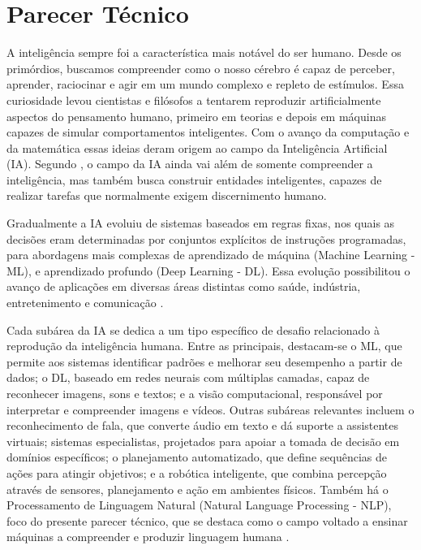 \chapter{Parecer Técnico} \label{cha:parecertecnico}

A inteligência sempre foi a característica mais notável do ser humano. Desde os primórdios, buscamos compreender como o nosso cérebro é capaz de perceber, aprender, raciocinar e agir em um mundo complexo e repleto de estímulos. Essa curiosidade levou cientistas e filósofos a tentarem reproduzir artificialmente aspectos do pensamento humano, primeiro em teorias e depois em máquinas capazes de simular comportamentos inteligentes. Com o avanço da computação e da matemática essas ideias deram origem ao campo da Inteligência Artificial (IA). Segundo \textcite{russell2022}, o campo da IA ainda vai além de somente compreender a inteligência, mas também busca construir entidades inteligentes, capazes de realizar tarefas que normalmente exigem discernimento humano.

Gradualmente a IA evoluiu de sistemas baseados em regras fixas, nos quais as decisões eram determinadas por conjuntos explícitos de instruções programadas, para abordagens mais complexas de aprendizado de máquina (Machine Learning - ML), e aprendizado profundo (Deep Learning - DL). Essa evolução possibilitou o avanço de aplicações em diversas áreas distintas como saúde, indústria, entretenimento e comunicação \cite{nilsson2010quest}.

Cada subárea da IA se dedica a um tipo específico de desafio relacionado à reprodução da inteligência humana. Entre as principais, destacam-se o ML, que permite aos sistemas identificar padrões e melhorar seu desempenho a partir de dados; o DL, baseado em redes neurais com múltiplas camadas, capaz de reconhecer imagens, sons e textos; e a visão computacional, responsável por interpretar e compreender imagens e vídeos.
Outras subáreas relevantes incluem o reconhecimento de fala, que converte áudio em texto e dá suporte a assistentes virtuais; sistemas especialistas, projetados para apoiar a tomada de decisão em domínios específicos; o planejamento automatizado, que define sequências de ações para atingir objetivos; e a robótica inteligente, que combina percepção através de sensores, planejamento e ação em ambientes físicos.
Também há o Processamento de Linguagem Natural (Natural Language Processing - NLP), foco do presente parecer técnico, que se destaca como o campo voltado a ensinar máquinas a compreender e produzir linguagem humana \cite{russell2022}.

